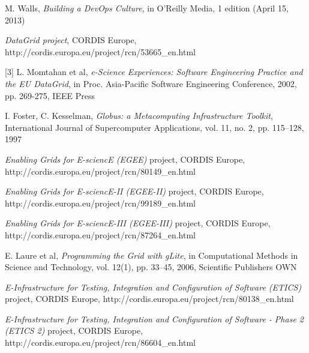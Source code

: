 \documentclass[journal]{IEEEtran}
\begin{document}
%
%
%
\begin{thebibliography}{1}

M. Walls, \emph{Building a DevOps Culture}, in O'Reilly Media, 1 edition (April 15, 2013)

\emph{DataGrid project}, CORDIS Europe, http://cordis.europa.eu/project/rcn/53665\_en.html

[3] L. Momtahan et al, \emph{e-Science Experiences: Software Engineering Practice and the EU DataGrid}, in Proc. Asia-Pacific Software Engineering Conference, 2002, pp. 269-275, IEEE Press

I. Foster, C. Kesselman, \emph{Globus: a Metacomputing Infrastructure Toolkit}, International Journal of Supercomputer Applications, vol. 11, no. 2, pp. 115–128, 1997

\emph{Enabling Grids for E-sciencE (EGEE)} project, CORDIS Europe, http://cordis.europa.eu/project/rcn/80149\_en.html

\emph{Enabling Grids for E-sciencE-II (EGEE-II)} project, CORDIS Europe, http://cordis.europa.eu/project/rcn/99189\_en.html

\emph{Enabling Grids for E-sciencE-III (EGEE-III)} project, CORDIS Europe, http://cordis.europa.eu/project/rcn/87264\_en.html

E. Laure et al, \emph{Programming the Grid with gLite}, in Computational Methods in Science and Technology, vol. 12(1), pp. 33–45, 2006, Scientific Publishers OWN

\emph{E-Infrastructure for Testing, Integration and Configuration of Software (ETICS)} project, CORDIS Europe, http://cordis.europa.eu/project/rcn/80138\_en.html

\emph{E-Infrastructure for Testing, Integration and Configuration of Software - Phase 2 (ETICS 2)} project, CORDIS Europe, http://cordis.europa.eu/project/rcn/86604\_en.html


\end{thebibliography}
\end{document}
